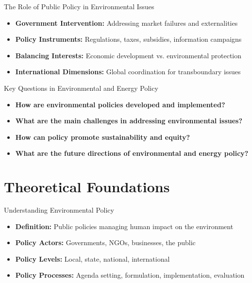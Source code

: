 \documentclass[11pt, aspectratio=169]{beamer}
\begin{document}
\begin{frame}{The Role of Public Policy in Environmental Issues}
    \begin{itemize}
        \item \textbf{Government Intervention:} Addressing market failures and externalities
        \item \textbf{Policy Instruments:} Regulations, taxes, subsidies, information campaigns
        \item \textbf{Balancing Interests:} Economic development vs. environmental protection
        \item \textbf{International Dimensions:} Global coordination for transboundary issues
    \end{itemize}
\end{frame}

\begin{frame}{Key Questions in Environmental and Energy Policy}
    \begin{itemize}
        \item \textbf{How are environmental policies developed and implemented?}
        \item \textbf{What are the main challenges in addressing environmental issues?}
        \item \textbf{How can policy promote sustainability and equity?}
        \item \textbf{What are the future directions of environmental and energy policy?}
    \end{itemize}
\end{frame}

\section{Theoretical Foundations}

\begin{frame}{Understanding Environmental Policy}
    \begin{itemize}
        \item \textbf{Definition:} Public policies managing human impact on the environment
        \item \textbf{Policy Actors:} Governments, NGOs, businesses, the public
        \item \textbf{Policy Levels:} Local, state, national, international
        \item \textbf{Policy Processes:} Agenda setting, formulation, implementation, evaluation
    \end{itemize}
\end{frame}
\end{document}
